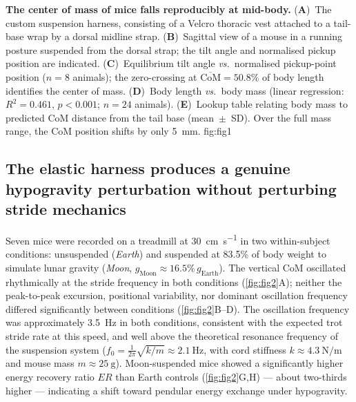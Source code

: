 \documentclass[blue]{enslyonstage}
\begin{document}
%
%

%
{%
\textbf{The center of mass of mice falls reproducibly at mid-body.}
(\textbf{A})~The custom suspension harness, consisting of a Velcro thoracic
vest attached to a tail-base wrap by a dorsal midline strap.
(\textbf{B})~Sagittal view of a mouse in a running posture suspended from the
dorsal strap; the tilt angle and normalised pickup position are indicated.
(\textbf{C})~Equilibrium tilt angle \textit{vs.}\ normalised pickup-point
position ($n = 8$ animals); the zero-crossing at $\overline{\mathrm{CoM}}
= 50.8\%$ of body length identifies the center of mass.
(\textbf{D})~Body length \textit{vs.}\ body mass (linear regression:
$R^2 = 0.461$, $p < 0.001$; $n = 24$ animals).
(\textbf{E})~Lookup table relating body mass to predicted CoM distance from
the tail base (mean~$\pm$~SD). Over the full mass range, the CoM position
shifts by only \qty{5}{\milli\metre}.%
}{fig:fig1}

\subsection{The elastic harness produces a genuine hypogravity perturbation without perturbing stride mechanics}

Seven mice were recorded on a treadmill at \qty{30}{\centi\metre\per\second}
in two within-subject conditions: unsuspended (\textit{Earth}) and suspended at
83.5\% of body weight to simulate lunar gravity (\textit{Moon},
$g_\text{Moon} \approx 16.5\%\,g_\text{Earth}$). The vertical CoM oscillated
rhythmically at the stride frequency in both conditions (\autoref{fig:fig2}A);
neither the peak-to-peak excursion, positional variability, nor dominant
oscillation frequency differed significantly between conditions
(\autoref{fig:fig2}B--D). The oscillation frequency was approximately
\qty{3.5}{\hertz} in both conditions, consistent with the expected trot stride
rate at this speed, and well above the theoretical resonance frequency of the
suspension system
($f_0 = \tfrac{1}{2\pi}\sqrt{k/m} \approx \qty{2.1}{\hertz}$, with cord
stiffness $k \approx \qty{4.3}{\newton\per\metre}$ and mouse mass
$m \approx \qty{25}{\gram}$). Moon-suspended mice showed a significantly higher
energy recovery ratio $ER$ than Earth controls (\autoref{fig:fig2}G,H) ---
about two-thirds higher --- indicating a shift toward pendular energy exchange
under hypogravity\cite{lacquanitiHumanLocomotionHypogravity2017a}.
\end{document}

